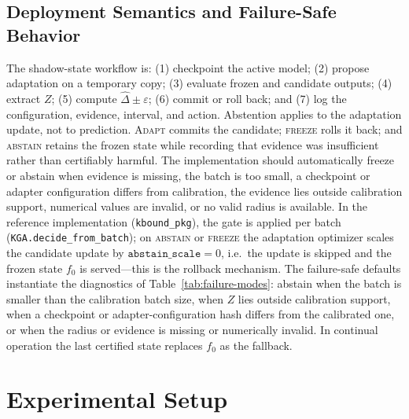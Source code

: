\subsection{Deployment Semantics and Failure-Safe Behavior}
The shadow-state workflow is: (1) checkpoint the active model; (2) propose adaptation on a temporary
copy; (3) evaluate frozen and candidate outputs; (4) extract $Z$; (5) compute
$\widehat\Delta\pm\varepsilon$; (6) commit or roll back; and (7) log the configuration, evidence,
interval, and action. Abstention applies to the adaptation update, not to prediction. \textsc{Adapt}
commits the candidate; \textsc{freeze} rolls it back; and \textsc{abstain} retains the frozen state
while recording that evidence was insufficient rather than certifiably harmful. The implementation
should automatically freeze or abstain when evidence is missing, the batch is too small, a checkpoint
or adapter configuration differs from calibration, the evidence lies outside calibration support,
numerical values are invalid, or no valid radius is available. In the reference implementation (\texttt{kbound\_pkg}), the gate is applied per batch
(\texttt{KGA.decide\_from\_batch}); on \textsc{abstain} or \textsc{freeze} the adaptation optimizer
scales the candidate update by $\texttt{abstain\_scale}{=}0$, i.e.\ the update is skipped and the
frozen state $f_0$ is served---this is the rollback mechanism. The failure-safe defaults instantiate
the diagnostics of Table~\ref{tab:failure-modes}: abstain when the batch is smaller than the
calibration batch size, when $Z$ lies outside calibration support, when a checkpoint or
adapter-configuration hash differs from the calibrated one, or when the radius or evidence is
missing or numerically invalid. In continual operation the last certified state replaces $f_0$ as
the fallback.




\section{Experimental Setup}\label{sec:exp-setup}
